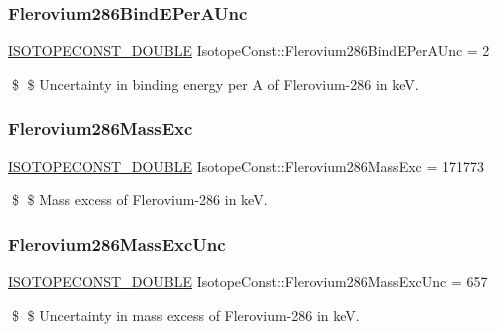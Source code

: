 \subsubsection{\texorpdfstring{Flerovium286\+Bind\+E\+Per\+A\+Unc}{Flerovium286BindEPerAUnc}}
{\footnotesize\ttfamily \mbox{\hyperlink{group___isotope_const-_macros_ga8f45a7272ce02c0b4c65c44636ed719a}{I\+S\+O\+T\+O\+P\+E\+C\+O\+N\+S\+T\+\_\+\+D\+O\+U\+B\+LE}} Isotope\+Const\+::\+Flerovium286\+Bind\+E\+Per\+A\+Unc = 2}

\$ \$ Uncertainty in binding energy per A of Flerovium-\/286 in keV. \mbox{\label{group___isotope_const-_flerovium-_fl286_gae4f917994d3db941281896440bb1a5ce}} 
\subsubsection{\texorpdfstring{Flerovium286\+Mass\+Exc}{Flerovium286MassExc}}
{\footnotesize\ttfamily \mbox{\hyperlink{group___isotope_const-_macros_ga8f45a7272ce02c0b4c65c44636ed719a}{I\+S\+O\+T\+O\+P\+E\+C\+O\+N\+S\+T\+\_\+\+D\+O\+U\+B\+LE}} Isotope\+Const\+::\+Flerovium286\+Mass\+Exc = 171773}

\$ \$ Mass excess of Flerovium-\/286 in keV. \mbox{\label{group___isotope_const-_flerovium-_fl286_ga223710ada9d14b3b1cf3868fa1f28b9e}} 
\subsubsection{\texorpdfstring{Flerovium286\+Mass\+Exc\+Unc}{Flerovium286MassExcUnc}}
{\footnotesize\ttfamily \mbox{\hyperlink{group___isotope_const-_macros_ga8f45a7272ce02c0b4c65c44636ed719a}{I\+S\+O\+T\+O\+P\+E\+C\+O\+N\+S\+T\+\_\+\+D\+O\+U\+B\+LE}} Isotope\+Const\+::\+Flerovium286\+Mass\+Exc\+Unc = 657}

\$ \$ Uncertainty in mass excess of Flerovium-\/286 in keV. \mbox{\label{group___isotope_const-_flerovium-_fl286_ga0f595d31b5bb7ffc63b7912e502a71d4}} 
